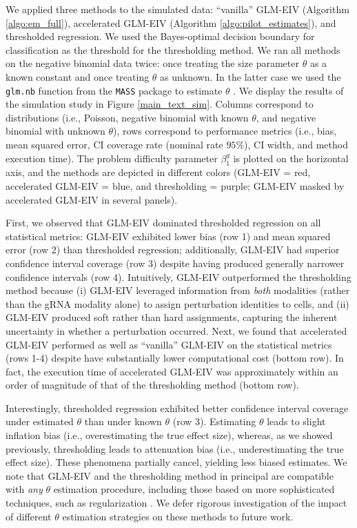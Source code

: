 \documentclass[12pt]{article}
\begin{document}
We applied three methods to the simulated data: ``vanilla'' GLM-EIV (Algorithm \ref{algo:em_full}), accelerated GLM-EIV (Algorithm \ref{algo:pilot_estimates}), and thresholded regression. We used the Bayes-optimal decision boundary for classification as the threshold for the thresholding method. We ran all methods on the negative binomial data twice: once treating the size parameter $\theta$ as a known constant and once treating $\theta$ as unknown. In the latter case we used the \texttt{glm.nb} function from the \texttt{MASS} package to estimate $\theta$ \cite{Ripley2013}. We display the results of the simulation study in Figure \ref{main_text_sim}. Columns correspond to distributions (i.e., Poisson, negative binomial with known $\theta$, and negative binomial with unknown $\theta$), rows correspond to performance metrics (i.e., bias, mean squared error, CI coverage rate (nominal rate $95\%$), CI width, and method execution time). The problem difficulty parameter $\beta^g_1$ is plotted on the horizontal axis, and the methods are depicted in different colors (GLM-EIV = red, accelerated GLM-EIV = blue, and thresholding = purple; GLM-EIV masked by accelerated GLM-EIV in several panels).

First, we observed that GLM-EIV dominated thresholded regression on all statistical metrics: GLM-EIV exhibited lower bias (row 1) and mean squared error (row 2) than thresholded regression; additionally, GLM-EIV had superior confidence interval coverage (row 3) despite having produced generally narrower confidence intervals (row 4). Intuitively, GLM-EIV outperformed the thresholding method because (i) GLM-EIV leveraged information from \textit{both} modalities (rather than the gRNA modality alone) to assign perturbation identities to cells, and (ii) GLM-EIV produced soft rather than hard assignments, capturing the inherent uncertainty in whether a perturbation occurred. Next, we found that accelerated GLM-EIV performed as well as ``vanilla'' GLM-EIV on the statistical metrics (rows 1-4) despite have substantially lower computational cost (bottom row). In fact, the execution time of accelerated GLM-EIV was approximately within an order of magnitude of that of the thresholding method (bottom row).

Interestingly, thresholded regression exhibited better confidence interval coverage under estimated $\theta$ than under known $\theta$ (row 3). Estimating $\theta$ leads to slight inflation bias (i.e., overestimating the true effect size), whereas, as we showed previously, thresholding leads to attenuation bias (i.e., underestimating the true effect size). These phenomena partially cancel, yielding less biased estimates. We note that GLM-EIV and the thresholding method in principal are compatible with \textit{any} $\theta$ estimation procedure, including those based on more sophisticated techniques, such as regularization \cite{Hafemeister2019}. We defer rigorous investigation of the impact of different $\theta$ estimation strategies on these methods to future work.
\end{document}
